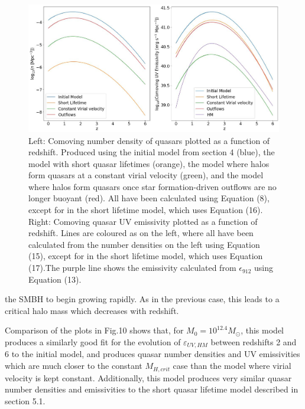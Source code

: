 \documentclass[12pt, twocolumn]{report}%
\begin{document}
\onecolumngrid


\begin{figure}[H]
\centering
\includegraphics[width=\linewidth]{Plot_10.jpeg}
\caption{Left: Comoving number density of quasars plotted as a function of redshift. Produced using the initial model from section 4 (blue), the model with short quasar lifetimes (orange), the model where halos form quasars at a constant virial velocity (green), and the model where halos form quasars once star formation-driven outflows are no longer buoyant (red). All have been calculated using Equation (8), except for in the short lifetime model, which uses Equation (16). Right: Comoving quasar UV emissivity plotted as a function of redshift. Lines are coloured as on the left, where all have been calculated from the number densities on the left using Equation (15), except for in the short lifetime model, which uses Equation (17).The purple line shows the emissivity calculated from $\epsilon_{912}$ using Equation (13).}
\label{fig:10}
\end{figure}
\clearpage
\twocolumngrid


\noindent the SMBH to begin growing rapidly. As in the previous case, this leads to a critical halo mass which decreases with redshift.\par

Comparison of the plots in Fig.10 shows that, for $M_0=10^{12.4}M_\odot$, this model produces a similarly good fit for the evolution of $\varepsilon_{UV,HM}$ between redshifts 2 and 6 to the initial model, and produces quasar number densities and UV emissivities which are much closer to the constant $M_{H,crit}$ case than the model where virial velocity is kept constant. Additionally, this model produces very similar quasar number densities and emissivities to the short quasar lifetime model described in section 5.1.

\end{document}
